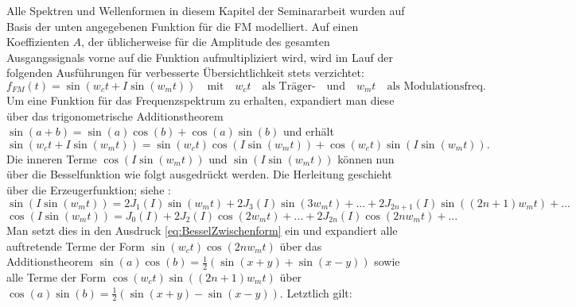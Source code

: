 Alle Spektren und Wellenformen in diesem Kapitel der Seminararbeit wurden auf Basis der unten angegebenen Funktion für die FM modelliert. Auf einen Koeffizienten $A$, der üblicherweise für die Amplitude des gesamten Ausgangssignals vorne auf die Funktion aufmultipliziert wird, wird im Lauf der folgenden Ausführungen für verbesserte Übersichtlichkeit stets verzichtet:
\label{matze:simplefm}
\begin{equation} \label{eq:SimpleFM}
f_{FM}(t) = \sin(w_ct + I\sin(w_mt)) \quad \text{mit} \quad w_ct \quad \text{als Träger-} \quad \text{und} \quad w_mt \quad \text{als Modulationsfreq.}
\end{equation}
Um eine Funktion für das Frequenzspektrum zu erhalten, expandiert man diese über das trigonometrische Additionstheorem \begin{math} \sin(a + b) = \sin(a)\cos(b)+\cos(a)\sin(b) \end{math} und erhält
\begin{equation}\label{eq:BesselZwischenform}
\sin(w_ct + I\sin(w_mt)) = \sin(w_ct)\cos(I\sin(w_mt)) + \cos(w_ct)\sin(I\sin(w_mt)).
\end{equation}
Die inneren Terme \begin{math} \cos(I\sin(w_mt)) \end{math} und \begin{math} \sin(I\sin(w_mt)) \end{math} können nun über die Besselfunktion wie folgt ausgedrückt werden. Die Herleitung geschieht über die Erzeugerfunktion; siehe \cite[S.361, Satz~9.1.42 und Satz~9.1.43]{abramowitz}:
\begin{equation}\label{eq:Besselsin}
\sin(I\sin(w_mt)) = 2J_1(I)\sin(w_mt)+2J_3(I)\sin(3w_mt)+...+2J_{2n+1}(I)\sin((2n+1)w_mt)+...
\end{equation}
\begin{equation}\label{eq:Besselcos}
\cos(I\sin(w_mt)) = J_0(I)+2J_2(I)\cos(2w_mt)+...+2J_{2n}(I)\cos(2nw_mt)+...
\end{equation}
Man setzt dies in den Ausdruck \ref{eq:BesselZwischenform} ein und expandiert alle auftretende Terme der Form \begin{math} \sin(w_ct)\cos(2nw_mt) \end{math} über das Additionstheorem \begin{math} \sin(a)\cos(b) = \frac{1}{2}\left(\sin(x+y)+\sin(x-y)\right) \end{math} sowie alle Terme der Form \begin{math} \cos(w_ct)\sin((2n+1)w_mt) \end{math} über  \begin{math} \cos(a)\sin(b) = \frac{1}{2}\left(\sin(x+y)-\sin(x-y)\right) \end{math}. Letztlich gilt: 
